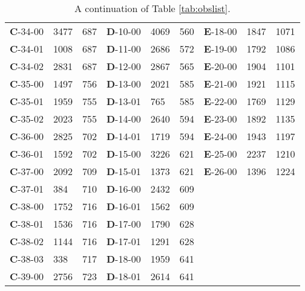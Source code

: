 \begin{table*}
\begin{tabular}{lllllllll}
\textbf{C}-34-00&3477&687&\textbf{D}-10-00&4069&560&\textbf{E}-18-00&1847&1071\\
\textbf{C}-34-01&1008&687&\textbf{D}-11-00&2686&572&\textbf{E}-19-00&1792&1086\\
\textbf{C}-34-02&2831&687&\textbf{D}-12-00&2867&565&\textbf{E}-20-00&1904&1101\\
\textbf{C}-35-00&1497&756&\textbf{D}-13-00&2021&585&\textbf{E}-21-00&1921&1115\\
\textbf{C}-35-01&1959&755&\textbf{D}-13-01&765&585&\textbf{E}-22-00&1769&1129\\
\textbf{C}-35-02&2023&755&\textbf{D}-14-00&2640&594&\textbf{E}-23-00&1892&1135\\
\textbf{C}-36-00&2825&702&\textbf{D}-14-01&1719&594&\textbf{E}-24-00&1943&1197\\
\textbf{C}-36-01&1592&702&\textbf{D}-15-00&3226&621&\textbf{E}-25-00&2237&1210\\
\textbf{C}-37-00&2092&709&\textbf{D}-15-01&1373&621&\textbf{E}-26-00&1396&1224\\
\textbf{C}-37-01&384&710&\textbf{D}-16-00&2432&609&&&\\
\textbf{C}-38-00&1752&716&\textbf{D}-16-01&1562&609&&&\\
\textbf{C}-38-01&1536&716&\textbf{D}-17-00&1790&628&&&\\
\textbf{C}-38-02&1144&716&\textbf{D}-17-01&1291&628&&&\\
\textbf{C}-38-03&338&717&\textbf{D}-18-00&1959&641&&&\\
\textbf{C}-39-00&2756&723&\textbf{D}-18-01&2614&641&&&\\
\hline
\hline
\end{tabular}
\caption[]{A continuation of Table \ref{tab:obslist}.}
\label{tab:obslist3}
\end{table*}

